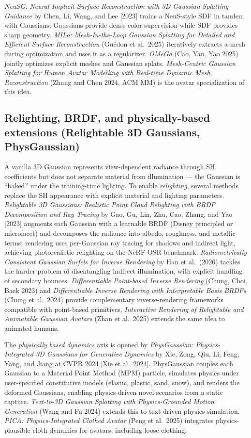 \emph{NeuSG: Neural Implicit Surface Reconstruction with 3D Gaussian Splatting Guidance} by Chen, Li, Wang, and Lee {[}2023{]} trains a NeuS-style SDF in tandem with Gaussians: Gaussians provide dense color supervision while SDF provides sharp geometry. \emph{MILo: Mesh-In-the-Loop Gaussian Splatting for Detailed and Efficient Surface Reconstruction} (Guédon et al.~2025) iteratively extracts a mesh during optimization and uses it as a regularizer. \emph{OMeGa} (Cao, Yan, Yao 2025) jointly optimizes explicit meshes and Gaussian splats. \emph{Mesh-Centric Gaussian Splatting for Human Avatar Modelling with Real-time Dynamic Mesh Reconstruction} (Zhang and Chen 2024, ACM MM) is the avatar specialization of this idea.

\subsection{Relighting, BRDF, and physically-based extensions (Relightable 3D Gaussians, PhysGaussian)}\label{relighting-brdf-and-physically-based-extensions-relightable-3d-gaussians-physgaussian}

A vanilla 3D Gaussian represents view-dependent radiance through SH coefficients but does not separate material from illumination --- the Gaussian is ``baked'' under the training-time lighting. To enable \emph{relighting}, several methods replace the SH appearance with explicit material and lighting parameters. \emph{Relightable 3D Gaussians: Realistic Point Cloud Relighting with BRDF Decomposition and Ray Tracing} by Gao, Gu, Lin, Zhu, Cao, Zhang, and Yao {[}2023{]} augments each Gaussian with a learnable BRDF (Disney principled or microfacet) and decomposes the radiance into albedo, roughness, and metallic terms; rendering uses per-Gaussian ray tracing for shadows and indirect light, achieving photorealistic relighting on the NeRF-OSR benchmark. \emph{Radiometrically Consistent Gaussian Surfels for Inverse Rendering} by Han et al.~(2026) tackles the harder problem of disentangling indirect illumination, with explicit handling of secondary bounces. \emph{Differentiable Point-based Inverse Rendering} (Chung, Choi, Baek 2023) and \emph{Differentiable Inverse Rendering with Interpretable Basis BRDFs} (Chung et al.~2024) provide complementary inverse-rendering frameworks compatible with point-based primitives. \emph{Interactive Rendering of Relightable and Animatable Gaussian Avatars} (Zhan et al.~2025) extends the same idea to animated humans.

The \emph{physically based dynamics} axis is opened by \emph{PhysGaussian: Physics-Integrated 3D Gaussians for Generative Dynamics} by Xie, Zong, Qiu, Li, Feng, Yang, and Jiang at CVPR 2024 {[}Xie et al.~2024{]}. PhysGaussian couples each Gaussian to a Material Point Method (MPM) particle, simulates physics under user-specified constitutive models (elastic, plastic, sand, snow), and renders the deformed Gaussians, enabling physics-driven novel scenarios from a static capture. \emph{Text-to-3D Gaussian Splatting with Physics-Grounded Motion Generation} (Wang and Fu 2024) extends this to text-driven physics simulation. \emph{PICA: Physics-Integrated Clothed Avatar} (Peng et al.~2025) integrates physics-plausible cloth dynamics for avatars, including loose clothing.

